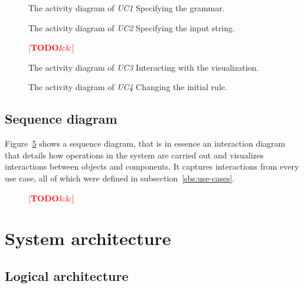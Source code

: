 \documentclass[english,engineering]{wizthesis}
\newcommand{\todo}[1]{%
  \textcolor{red}{[\textbf{TODO}\ifx&#1&{}\else{ }\fi\emph{#1}]}%
}
\begin{document}
\begin{figure}[H]
  \centering
  \resizebox{0.75\textwidth}{!}{\footnotesize}
  \caption{The activity diagram of \emph{UC1} Specifying the grammar.}
  \label{fig:uc1-activity-diagram}
\end{figure}

\begin{figure}[H]
  \centering
  \resizebox{0.75\textwidth}{!}{\footnotesize}
  \caption{The activity diagram of \emph{UC2} Specifying the input string.}
  \label{fig:uc2-activity-diagram}
\end{figure}

\begin{figure}[H]
  \centering
  \todo{}
  \caption{The activity diagram of \emph{UC3} Interacting with the
  \label{fig:uc3-activity-diagram}
  visualization.}
\end{figure}

\begin{figure}[H]
  \centering
  \resizebox{\textwidth}{!}{\footnotesize}
  \caption{The activity diagram of \emph{UC4} Changing the initial rule.}
  \label{fig:uc4-activity-diagram}
\end{figure}

\subsection{Sequence diagram}

Figure~\ref{fig:sequence-diagram} shows a sequence diagram, that is in essence
an interaction diagram that details how operations in the system are carried out
and visualizes interactions between objects and components. It captures
interactions from every use case, all of which were defined in
subsection~\ref{sbs:use-cases}.

\begin{figure}[H]
  \centering
  \resizebox{0.75\textwidth}{!}{\footnotesize}
  \caption{\todo{}}
  \label{fig:sequence-diagram}
\end{figure}

\section{System architecture} \label{sec:system-architecture}

\subsection{Logical architecture}
\end{document}
